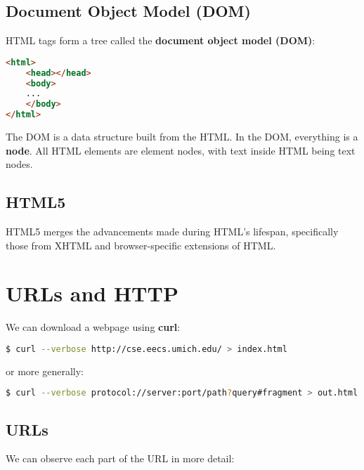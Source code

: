 \subsection{Document Object Model (DOM)}
HTML tags form a tree called the \textbf{document object model (DOM)}: 

\begin{lstlisting}[language=html]
<html>
	<head></head>
	<body>
	...
	</body>
</html>
\end{lstlisting}

The DOM is a data structure built from the HTML. In the DOM, everything is a \textbf{node}. All HTML elements are element nodes, with text inside HTML being text nodes.

\subsection{HTML5}
HTML5 merges the advancements made during HTML's lifespan, specifically those from XHTML and browser-specific extensions of HTML.

\section{URLs and HTTP}
We can download a webpage using \textbf{curl}:
\begin{lstlisting}[language=bash]
$ curl --verbose http://cse.eecs.umich.edu/ > index.html
\end{lstlisting}
or more generally:
\begin{lstlisting}[language=bash]
$ curl --verbose protocol://server:port/path?query#fragment > out.html
\end{lstlisting}

\subsection{URLs}
We can observe each part of the URL in more detail:


